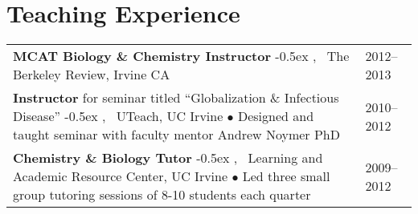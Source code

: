 \documentclass[letterpaper]{article}
\newcommand{\newlineb}                 %
    {
      \newline 
      \small                           %
      \hspace{0.30cm}                  %
      $\bullet$                        %
      }
\newcommand{\newlinea}{\kern-0.5ex , \ } %
\begin{document}
\section*{Teaching Experience \hrulefill}
\begin{tabular}{L{14.5 cm}R{2.0 cm}}

\textbf{MCAT Biology \& Chemistry Instructor}
  \newlinea The Berkeley Review, Irvine CA 
& 2012--2013 \\
  
\textbf{Instructor} for seminar titled ``Globalization \& Infectious Disease'' 
  \newlinea UTeach, UC Irvine
  {\newlineb Designed and taught seminar with faculty mentor Andrew Noymer PhD}
& 2010--2012 \\
  
\textbf{Chemistry \& Biology Tutor}
  \newlinea Learning and Academic Resource Center, UC Irvine
  {\newlineb Led three small group tutoring sessions of 8-10 students each quarter}
& 2009--2012 \\


\end{tabular}

\end{document}
